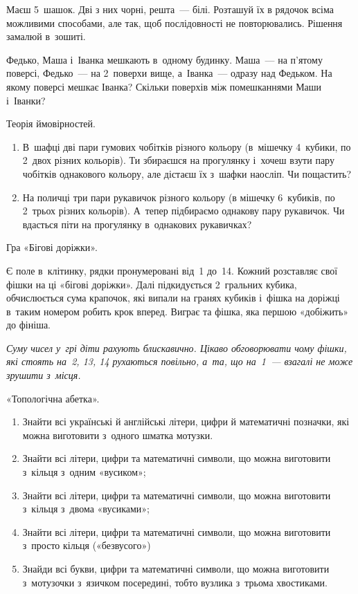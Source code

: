 \problem
Маєш 5~шашок. Дві з них чорні, решта~--- білі.
Розташуй їх в рядочок всіма можливими способами, але так,
щоб послідовності не повторювались.
Рішення замалюй в~зошиті.


\problem
Федько, Маша і~Іванка мешкають в~одному будинку.
Маша~--- на п’ятому поверсі, Федько~--- на 2~поверхи вище,
а~Іванка~--- одразу над Федьком.
На якому поверсі мешкає Іванка?
Скільки поверхів між помешканнями Маши і~Іванки?


\problem
Теорія ймовірностей.
\begin{enumerate}
    \item В~шафці дві пари гумових чобітків різного кольору
    (в~мішечку 4~кубики, по 2~двох різних кольорів).
    Ти збираєшся на прогулянку і~хочеш взути пару чобітків однакового кольору,
    але дістаєш їх з~шафки наосліп. Чи пощастить?
    \item На поличці три пари рукавичок різного кольору
    (в мішечку 6~кубиків, по 2~трьох різних кольорів).
    А~тепер підбираємо однакову пару рукавичок.
    Чи вдасться піти на прогулянку в~однакових рукавичках?
\end{enumerate}


\problem
Гра «Бігові доріжки».

Є поле в~клітинку, рядки пронумеровані від~1 до~14.
Кожний розставляє свої фішки на ці «бігові доріжки».
Далі підкидується 2~гральних кубика, обчислюється сума крапочок,
які випали на гранях кубиків і~фішка на доріжці в~таким номером
робить крок вперед.
Виграє та фішка, яка першою «добіжить» до фініша.

\emph{
Суму чисел у~грі діти рахують блискавично.
Цікаво обговорювати чому фішки, які стоять на~2, 13, 14 рухаються повільно,
а~та, що на~1~--- взагалі не може зрушити з~місця.
}


\problem
«Топологічна абетка».
\begin{enumerate}
    \item Знайти всі українські й англійські літери, цифри
    й математичні позначки, які можна виготовити з~одного шматка мотузки.
    \item Знайти всі літери, цифри та математичні символи,
    що можна виготовити з~кільця з~одним «вусиком»;
    \item Знайти всі літери, цифри та математичні символи,
    що можна виготовити з~кільця з~двома «вусиками»;
    \item Знайти всі літери, цифри та математичні символи,
    що можна виготовити з~просто кільця («безвусого»)
    \item Знайди всі букви, цифри та математичні символи,
    що можна виготовити з~мотузочки з~язичком посередині,
    тобто вузлика з~трьома хвостиками.
\end{enumerate}

